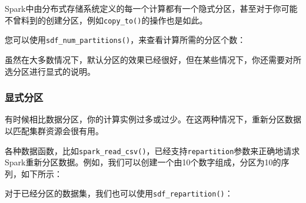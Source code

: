 \documentclass[
]{article}
\newenvironment{Shaded}{\begin{snugshade}}{\end{snugshade}}
\newcommand{\DataTypeTok}[1]{\textcolor[rgb]{0.13,0.29,0.53}{#1}}
\newcommand{\DecValTok}[1]{\textcolor[rgb]{0.00,0.00,0.81}{#1}}
\newcommand{\KeywordTok}[1]{\textcolor[rgb]{0.13,0.29,0.53}{\textbf{#1}}}
\newcommand{\NormalTok}[1]{#1}
\newcommand{\OperatorTok}[1]{\textcolor[rgb]{0.81,0.36,0.00}{\textbf{#1}}}
\newcommand{\StringTok}[1]{\textcolor[rgb]{0.31,0.60,0.02}{#1}}
\begin{document}
Spark中由分布式存储系统定义的每一个计算都有一个隐式分区，甚至对于你可能不曾料到的创建分区，例如\texttt{copy\_to()}的操作也是如此。

您可以使用\texttt{sdf\_num\_partitions()}，来查看计算所需的分区个数：

\begin{Shaded}
\end{Shaded}

虽然在大多数情况下，默认分区的效果已经很好，但在某些情况下，你还需要对所选分区进行显式的说明。

\hypertarget{ux663eux5f0fux5206ux533a}{%
\subsubsection{显式分区}\label{ux663eux5f0fux5206ux533a}}

有时候相比数据分区，你的计算实例过多或过少。在这两种情况下，重新分区数据以匹配集群资源会很有用。

各种数据函数，比如\texttt{spark\_read\_csv()}，已经支持\texttt{repartition}参数来正确地请求Spark重新分区数据。例如，我们可以创建一个由10个数字组成，分区为10的序列，如下所示：

\begin{Shaded}
\end{Shaded}

对于已经分区的数据集，我们也可以使用\texttt{sdf\_repartition()}：

\begin{Shaded}
\end{Shaded}
\end{document}
